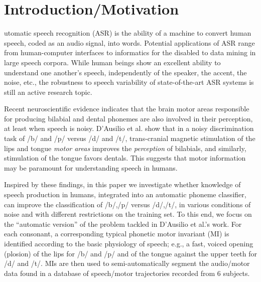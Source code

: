 \section{Introduction/Motivation}
\label{sec:intro}

utomatic speech recognition (ASR) is the ability of a machine
to convert human speech, coded as an audio signal, into words.
Potential applications of ASR range from human-computer interfaces
to informatics for the disabled to data mining in large speech corpora.
While human beings show an excellent ability to understand one another's speech,
independently of the speaker, the accent, the noise, etc., the robustness to
speech variability of state-of-the-art ASR systems is still an active research
topic.

Recent neuroscientific evidence indicates that the brain motor areas responsible for
producing bilabial and dental phonemes are also involved in their perception, at least
when speech is noisy. D'Ausilio et al. \cite{dausilio}
show that in a noisy discrimination task of /b/ and /p/ versus /d/
and /t/, trans-cranial magnetic stimulation of the lips and tongue \emph{motor areas}
improves the \emph{perception} of bilabials, and similarly, stimulation of the tongue
favors dentals. This suggests that motor information may be paramount for
understanding speech in humans.

Inspired by these findings, in this paper we investigate whether knowledge of speech
production in humans, integrated into an automatic phoneme classifier, can improve the
classification of /b/,/p/ versus /d/,/t/, in various conditions of noise and with different
restrictions on the training set.
To this end, we focus on the ``automatic version'' of the problem tackled in D'Ausilio et al.'s
work. For each consonant, a corresponding typical phonetic motor invariant (MI) is identified
according to the basic physiology of speech; e.g., a fast, voiced opening (plosion) of the lips
for /b/ and /p/ and of the tongue against the upper teeth for /d/ and /t/.
MIs are then used to semi-automatically segment the audio/motor data found in a
database of speech/motor trajectories recorded from $6$ subjects.

